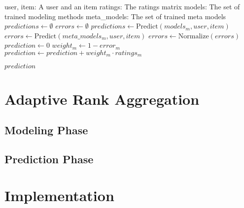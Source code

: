 \begin{algorithm}
  \begin{algorithmic}[1]
  \REQUIRE user, item: A user and an item
  \REQUIRE ratings: The ratings matrix
  \REQUIRE models: The set of trained modeling methods 
  \REQUIRE meta\_models: The set of trained meta models
  \ENSURE
    \STATE $predictions \gets \emptyset$
    \STATE $errors  \gets \emptyset$
      \STATE $predictions \gets \mathrm{Predict}(models_m, user, item)$
      \STATE $errors  \gets \mathrm{Predict}(meta\_models_m, user, item)$
    \ENDFOR 
    \STATE $errors \gets \mathrm{Normalize}(errors)$
    \STATE $prediction \gets 0$
      \STATE $weight_m \gets 1 - error_m$
      \STATE $prediction \gets prediction + weight_m \cdot ratings_m$
    \ENDFOR
 
  \RETURN $prediction$
  \end{algorithmic}
  \caption[Prediction]{Prediction
  }
  \label{code:prediction}
\end{algorithm}




\section{Adaptive Rank Aggregation}
\label{sec:methods:rank}

\subsection{Modeling Phase}

\subsection{Prediction Phase}

\section{Implementation}
